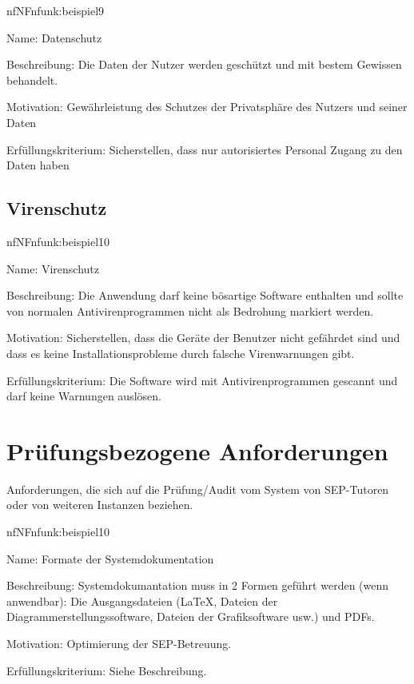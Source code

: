 \begin{description}[leftmargin=5em, style=sameline]	
	\begin{lhp}{nf}{NF}{nfunk:beispiel9}
		\item [Name:] Datenschutz
		\item [Beschreibung:] Die Daten der Nutzer werden geschützt und mit bestem Gewissen behandelt.
		\item [Motivation:] Gewährleistung des Schutzes der Privatsphäre des Nutzers und seiner Daten
		\item [Erfüllungskriterium:] Sicherstellen, dass nur autorisiertes Personal
Zugang zu den Daten haben
	\end{lhp}
\end{description}


\subsection{Virenschutz}

\begin{description}[leftmargin=5em, style=sameline]	
	\begin{lhp}{nf}{NF}{nfunk:beispiel10}
		\item [Name:] Virenschutz
		\item [Beschreibung:] Die Anwendung darf keine bösartige Software enthalten und sollte von normalen Antivirenprogrammen nicht als Bedrohung markiert werden.
		\item [Motivation:] Sicherstellen, dass die Geräte der Benutzer nicht gefährdet sind und dass es keine Installationsprobleme durch falsche Virenwarnungen gibt.
		\item [Erfüllungskriterium:] Die Software wird mit Antivirenprogrammen gescannt und darf keine Warnungen auslösen.
	\end{lhp}
\end{description}

\section{Prüfungsbezogene Anforderungen}

Anforderungen, die sich auf die Prüfung/Audit vom System von SEP-Tutoren oder von weiteren Instanzen beziehen.


\begin{description}[leftmargin=5em, style=sameline]	
	\begin{lhp}{nf}{NF}{nfunk:beispiel10}
		\item [Name:] Formate der Systemdokumentation
		\item [Beschreibung:] Systemdokumantation muss in 2 Formen geführt werden (wenn anwendbar): Die Ausgangsdateien (\LaTeX, Dateien der Diagrammerstellungssoftware, Dateien der Grafiksoftware usw.) und PDFs.
		\item [Motivation:] Optimierung der SEP-Betreuung.
		\item [Erfüllungskriterium:] Siehe Beschreibung.
	\end{lhp}
\end{description}

